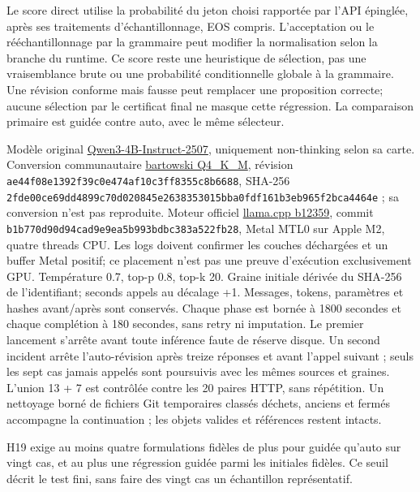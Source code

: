 \documentclass[11pt]{article}
\begin{document}
Le score direct utilise la probabilité du jeton choisi rapportée par l'API épinglée, après ses traitements d'échantillonnage, EOS compris. L'acceptation ou le rééchantillonnage par la grammaire peut modifier la normalisation selon la branche du runtime. Ce score reste une heuristique de sélection, pas une vraisemblance brute ou une probabilité conditionnelle globale à la grammaire. Une révision conforme mais fausse peut remplacer une proposition correcte; aucune sélection par le certificat final ne masque cette régression. La comparaison primaire est guidée contre auto, avec le même sélecteur.

Modèle original \href{\detokenize{https://huggingface.co/Qwen/Qwen3-4B-Instruct-2507}}{Qwen3-4B-Instruct-2507}, uniquement non-thinking selon sa carte. Conversion communautaire \href{\detokenize{https://huggingface.co/bartowski/Qwen_Qwen3-4B-Instruct-2507-GGUF}}{bartowski Q4\_K\_M}, révision \texttt{ae44f08e13\allowbreak{}92f39c0e47\allowbreak{}4af10c3ff8\allowbreak{}355c8b6688\allowbreak{}}, SHA-256 \texttt{2fde00ce69\allowbreak{}dd4899c70d\allowbreak{}020845e263\allowbreak{}8353015bba\allowbreak{}0fdf161b3e\allowbreak{}b965f2bca4\allowbreak{}464e} ; sa conversion n’est pas reproduite. Moteur officiel \href{\detokenize{https://github.com/ggml-org/llama.cpp/releases/tag/b12359}}{llama.cpp b12359}, commit \texttt{b1b770d90d\allowbreak{}94cad9e9ea\allowbreak{}5b993bdbc3\allowbreak{}83a522fb28\allowbreak{}}, Metal MTL0 sur Apple M2, quatre threads CPU. Les logs doivent confirmer les couches déchargées et un buffer Metal positif; ce placement n’est pas une preuve d’exécution exclusivement GPU. Température 0.7, top-p 0.8, top-k 20. Graine initiale dérivée du SHA-256 de l’identifiant; seconds appels au décalage +1. Messages, tokens, paramètres et hashes avant/après sont conservés. Chaque phase est bornée à 1800 secondes et chaque complétion à 180 secondes, sans retry ni imputation. Le premier lancement s’arrête avant toute inférence faute de réserve disque. Un second incident arrête l’auto-révision après treize réponses et avant l’appel suivant ; seuls les sept cas jamais appelés sont poursuivis avec les mêmes sources et graines. L’union 13 + 7 est contrôlée contre les 20 paires HTTP, sans répétition. Un nettoyage borné de fichiers Git temporaires classés déchets, anciens et fermés accompagne la continuation ; les objets valides et références restent intacts.

H19 exige au moins quatre formulations fidèles de plus pour guidée qu'auto sur vingt cas, et au plus une régression guidée parmi les initiales fidèles. Ce seuil décrit le test fini, sans faire des vingt cas un échantillon représentatif.
\end{document}
